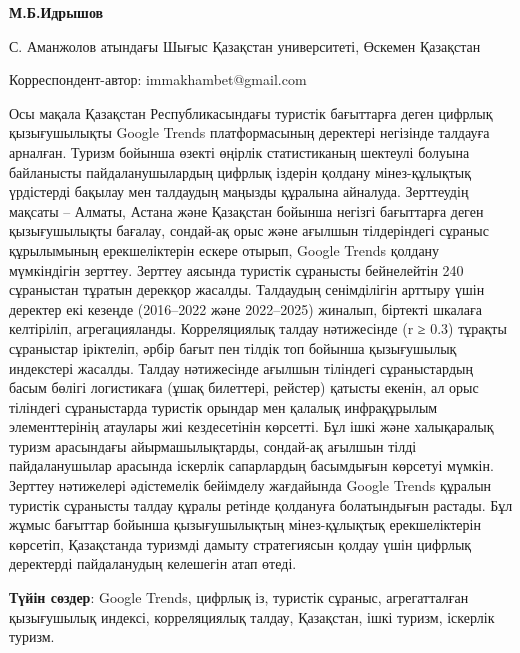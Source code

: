 
\begin{articleheader}

{\bfseries М.Б.Идрышов}
\end{articleheader}

\begin{affiliation}
С. Аманжолов атындағы Шығыс Қазақстан университеті, Өскемен Қазақстан

\raggedright \textsuperscript{\envelope }Корреспондент-автор: immakhambet@gmail.com
\end{affiliation}

Осы мақала Қазақстан Республикасындағы туристік бағыттарға деген цифрлық
қызығушылықты Google Trends платформасының деректері негізінде талдауға
арналған. Туризм бойынша өзекті өңірлік статистиканың шектеулі болуына
байланысты пайдаланушылардың цифрлық іздерін қолдану мінез-құлықтық
үрдістерді бақылау мен талдаудың маңызды құралына айналуда. Зерттеудің
мақсаты -- Алматы, Астана және Қазақстан бойынша негізгі бағыттарға
деген қызығушылықты бағалау, сондай-ақ орыс және ағылшын тілдеріндегі
сұраныс құрылымының ерекшеліктерін ескере отырып, Google Trends қолдану
мүмкіндігін зерттеу. Зерттеу аясында туристік сұранысты бейнелейтін 240
сұраныстан тұратын дерекқор жасалды. Талдаудың сенімділігін арттыру үшін
деректер екі кезеңде (2016--2022 және 2022--2025) жиналып, біртекті
шкалаға келтіріліп, агрегацияланды. Корреляциялық талдау нәтижесінде (r
≥ 0.3) тұрақты сұраныстар іріктеліп, әрбір бағыт пен тілдік топ бойынша
қызығушылық индекстері жасалды. Талдау нәтижесінде ағылшын тіліндегі
сұраныстардың басым бөлігі логистикаға (ұшақ билеттері, рейстер) қатысты
екенін, ал орыс тіліндегі сұраныстарда туристік орындар мен қалалық
инфрақұрылым элементтерінің атаулары жиі кездесетінін көрсетті. Бұл ішкі
және халықаралық туризм арасындағы айырмашылықтарды, сондай-ақ ағылшын
тілді пайдаланушылар арасында іскерлік сапарлардың басымдығын көрсетуі
мүмкін. Зерттеу нәтижелері әдістемелік бейімделу жағдайында Google
Trends құралын туристік сұранысты талдау құралы ретінде қолдануға
болатындығын растады. Бұл жұмыс бағыттар бойынша қызығушылықтың
мінез-құлықтық ерекшеліктерін көрсетіп, Қазақстанда туризмді дамыту
стратегиясын қолдау үшін цифрлық деректерді пайдаланудың келешегін атап
өтеді.

{\bfseries Түйін сөздер}: Google Trends, цифрлық із, туристік сұраныс,
агрегатталған қызығушылық индексі, корреляциялық талдау, Қазақстан, ішкі
туризм, іскерлік туризм.

